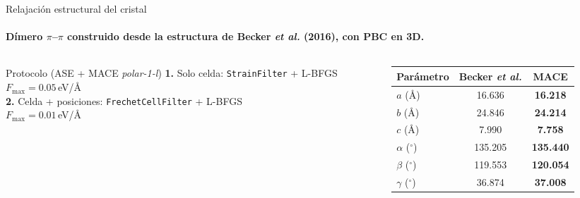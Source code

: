 \documentclass[aspectratio=169,11pt]{beamer}
\begin{document}
\begin{frame}{Relajación estructural del cristal}
  \framesubtitle{Dímero $\pi$--$\pi$ construido desde la estructura de Becker \emph{et al.} (2016), con PBC en 3D.}
  \begin{columns}[c,onlytextwidth]
    \begin{column}{0.48\textwidth}
      \begin{block}{Protocolo (ASE + MACE \textit{polar-1-l})}
        \footnotesize
        \textbf{1.} Solo celda: \texttt{StrainFilter} + L-BFGS\\
        \hspace*{1em}$F_{\max}=0.05$\,eV/\AA\\[0.3em]
        \textbf{2.} Celda + posiciones: \texttt{FrechetCellFilter} + L-BFGS\\
        \hspace*{1em}$F_{\max}=0.01$\,eV/\AA
      \end{block}
    \end{column}
    \begin{column}{0.48\textwidth}
      \centering\small
      \renewcommand{\arraystretch}{1.2}
      \begin{tabular}{@{}lcc@{}}
        \toprule
        Parámetro & Becker \emph{et al.} & \textbf{MACE} \\
        \midrule
        $a$ (\AA)           & 16.636  & \textbf{16.218} \\
        $b$ (\AA)           & 24.846  & \textbf{24.214} \\
        $c$ (\AA)           & 7.990   & \textbf{7.758} \\
        $\alpha$ ($^\circ$) & 135.205 & \textbf{135.440} \\
        $\beta$ ($^\circ$)  & 119.553 & \textbf{120.054} \\
        $\gamma$ ($^\circ$) & 36.874  & \textbf{37.008} \\
        \bottomrule
      \end{tabular}
    \end{column}
  \end{columns}
\end{frame}
\end{document}
